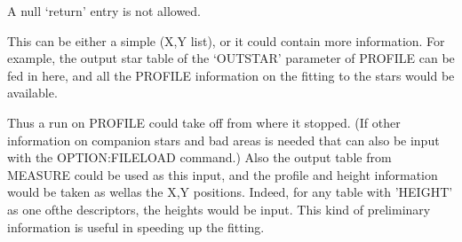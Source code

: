 {{{ A null `return' entry is not allowed.
                                                                               
 This can be  either a simple (X,Y list), or it could contain more
 information. For example, the output star table of the `OUTSTAR' parameter
 of PROFILE can be fed in here, and all the PROFILE information on the
 fitting to the stars would be available.
                                                                               
 Thus a run on PROFILE could take off from where it stopped.
 (If other information on companion stars and bad areas is needed that
 can also be input with the OPTION:FILELOAD command.) Also the output
 table from MEASURE could be used as this input, and the profile and
 height information would be taken as wellas the X,Y positions. Indeed,
 for any table with 'HEIGHT' as one ofthe descriptors, the heights would
 be input. This kind of preliminary information is useful in speeding up
 the fitting.
                                                                               
}}}
